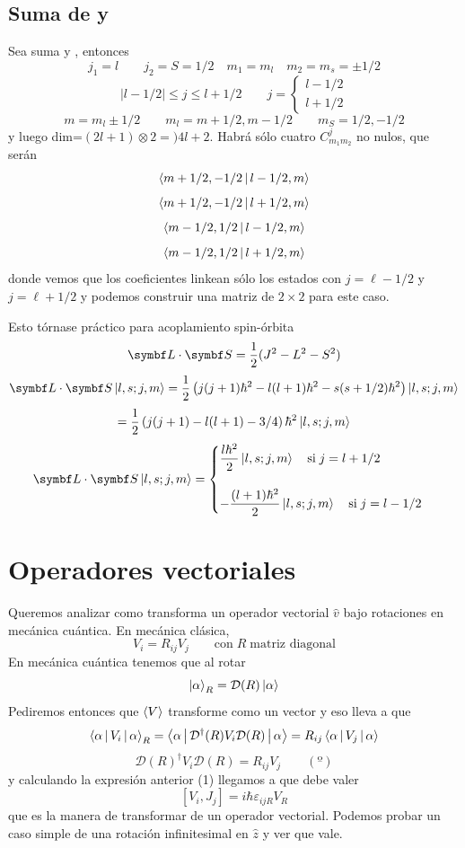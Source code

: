 \documentclass[10pt,oneside]{CBFT_book}
\begin{document}
\subsection{Suma de  y }

Sea suma  y , entonces 
\[
	j_1 = l \qquad j_2 = S= 1/2 \quad m_1=m_l \quad m_2=m_s = \pm 1/2
\]
\[
	|l - 1/2| \leq j \leq l + 1/2  \qquad j=\begin{cases} l-1/2 \\ l+1/2\end{cases}
\]
\[
	m = m_l \pm 1/2 \qquad m_l = m + 1/2 , m- 1/2 \qquad m_S = 1/2, -1/2
\]
y luego dim=$(2l+1)\otimes 2 =) 4l+2$.
Habrá sólo cuatro $C_{m_1 m_2}^j$ no nulos, que serán 
\[
	\Braket{ m + 1/2, -1/2 | l - 1/2, m }
\]
\[
	\Braket{ m + 1/2, -1/2 | l + 1/2, m }
\]
\[
	\Braket{ m - 1/2, 1/2 | l - 1/2, m }
\]
\[
	\Braket{ m - 1/2, 1/2 | l + 1/2, m }
\]
donde vemos que los coeficientes linkean sólo los estados con $j=\ell-1/2$ y $j=\ell+1/2$ y podemos construir 
una matriz de $2\times 2$ para este caso.

Esto tórnase práctico para acoplamiento spin-órbita 
\[
	\vb{L}\cdot\vb{S} = \frac{1}{2}(J^2 - L^2 - S^2)
\]
\[
	\vb{L}\cdot\vb{S} \Ket{l,s;j,m} =  \frac{1}{2}\left( j(j+1)\hbar^2 - 
		l(l+1)\hbar^2 - s(s+1/2)\hbar^2 \right) \Ket{l,s;j,m}
\]
\[
	= \frac{1}{2}\left( j(j+1) - l(l+1) - 3/4 \right) \hbar^2 \Ket{l,s;j,m}
\]
\[
	\vb{L}\cdot\vb{S} \Ket{l,s;j,m} = \begin{cases} 
		\displaystyle \frac{l\hbar^2}{2} \Ket{l,s;j,m} \quad \text{si} \; j=l+1/2\\ 
		\\
		\displaystyle -\frac{(l+1)\hbar^2}{2}\Ket{l,s;j,m} \quad \text{si} \; j=l-1/2
	\end{cases}
\]

\section{Operadores vectoriales}

Queremos analizar como transforma un operador vectorial $\hat{v}$ bajo rotaciones en mecánica cuántica.
En mecánica clásica,
\[
	V_i = R_{ij} V_j \qquad \text{con} \; R \; \text{matriz diagonal}
\]
En mecánica cuántica tenemos que al rotar
\[
	\Ket{\alpha}_R = \mathcal{D}(R)\Ket{\alpha}
\]
Pediremos entonces que $\Braket{V}$ transforme como un vector y eso lleva a que 
\[
	\Braket{\alpha|V_i|\alpha}_R = \Braket{\alpha|\mathcal{D}^\dagger(R)V_i\mathcal{D}(R)|\alpha} =
	R_{ij} \Braket{\alpha|V_j|\alpha}
\]
\[
	\mathcal{D}(R)^\dagger V_i \mathcal{D}(R) = R_{ij}V_j \qquad (º)
\]
y calculando la expresión anterior (1) llegamos a que debe valer
\[
	[V_i,J_j] =  i\hbar \varepsilon_{ijR}V_R
\]
que es la manera de transformar de un operador vectorial. Podemos probar un caso simple de una rotación 
infinitesimal en $\hat{z}$ y ver que vale.
\end{document}
